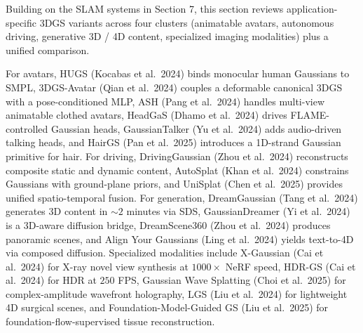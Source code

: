 \documentclass{article}
\begin{document}
Building on the SLAM systems in Section 7, this section reviews application-specific 3DGS variants across four clusters (animatable avatars, autonomous driving, generative 3D / 4D content, specialized imaging modalities) plus a unified comparison.

For avatars, HUGS (Kocabas et al.~2024) binds monocular human Gaussians to SMPL, 3DGS-Avatar (Qian et al.~2024) couples a deformable canonical 3DGS with a pose-conditioned MLP, ASH (Pang et al.~2024) handles multi-view animatable clothed avatars, HeadGaS (Dhamo et al.~2024) drives FLAME-controlled Gaussian heads, GaussianTalker (Yu et al.~2024) adds audio-driven talking heads, and HairGS (Pan et al.~2025) introduces a 1D-strand Gaussian primitive for hair. For driving, DrivingGaussian (Zhou et al.~2024) reconstructs composite static and dynamic content, AutoSplat (Khan et al.~2024) constrains Gaussians with ground-plane priors, and UniSplat (Chen et al.~2025) provides unified spatio-temporal fusion. For generation, DreamGaussian (Tang et al.~2024) generates 3D content in \(\sim 2\) minutes via SDS, GaussianDreamer (Yi et al.~2024) is a 3D-aware diffusion bridge, DreamScene360 (Zhou et al.~2024) produces panoramic scenes, and Align Your Gaussians (Ling et al.~2024) yields text-to-4D via composed diffusion. Specialized modalities include X-Gaussian (Cai et al.~2024) for X-ray novel view synthesis at \(1000{\times}\) NeRF speed, HDR-GS (Cai et al.~2024) for HDR at \(250\) FPS, Gaussian Wave Splatting (Choi et al.~2025) for complex-amplitude wavefront holography, LGS (Liu et al.~2024) for lightweight 4D surgical scenes, and Foundation-Model-Guided GS (Liu et al.~2025) for foundation-flow-supervised tissue reconstruction.
\end{document}
